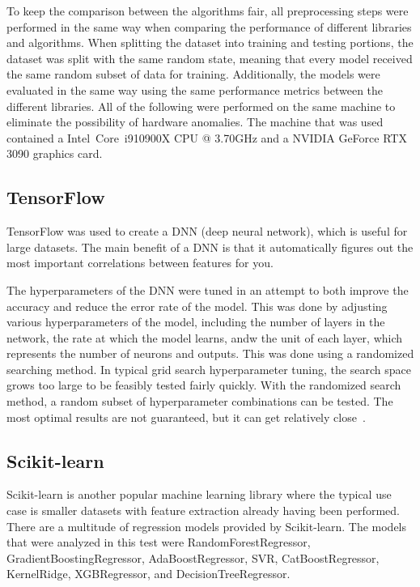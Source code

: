 \documentclass[lettersize,journal]{IEEEtran}
\begin{document}
To keep the comparison between the algorithms fair, all preprocessing steps were performed in the same way when comparing the performance of different libraries and algorithms. When splitting the dataset into training and testing portions, the dataset was split with the same random state, meaning that every model received the same random subset of data for training. Additionally, the models were evaluated in the same way using the same performance metrics between the different libraries. All of the following were performed on the same machine to eliminate the possibility of hardware anomalies. The machine that was used contained a  Intel\textregistered~Core\texttrademark~i9\-10900X CPU @ 3.70GHz and a NVIDIA GeForce RTX 3090 graphics card. 


\subsection{TensorFlow}
TensorFlow was used to create a DNN (deep neural network), which is useful for large datasets. The main benefit of a DNN is that it automatically figures out the most important correlations between features for you. 

The hyperparameters of the DNN were tuned in an attempt to both improve the accuracy and reduce the error rate of the model. This was done by adjusting various hyperparameters of the model, including the number of layers in the network, the rate at which the model learns, andw the unit of each layer, which represents the number of neurons and outputs. This was done using a randomized searching method. In typical grid search hyperparameter tuning, the search space grows too large to be feasibly tested fairly quickly. With the randomized search method, a random subset of hyperparameter combinations can be tested. The most optimal results are not guaranteed, but it can get relatively close~\cite{omalley2019kerastuner}. 


\subsection{Scikit-learn}
Scikit-learn is another popular machine learning library where the typical use case is smaller datasets with feature extraction already having been performed. There are a multitude of regression models provided by Scikit-learn. The models that were analyzed in this test were RandomForestRegressor, GradientBoostingRegressor, AdaBoostRegressor, SVR, CatBoostRegressor, KernelRidge, XGBRegressor, and DecisionTreeRegressor.
\end{document}

